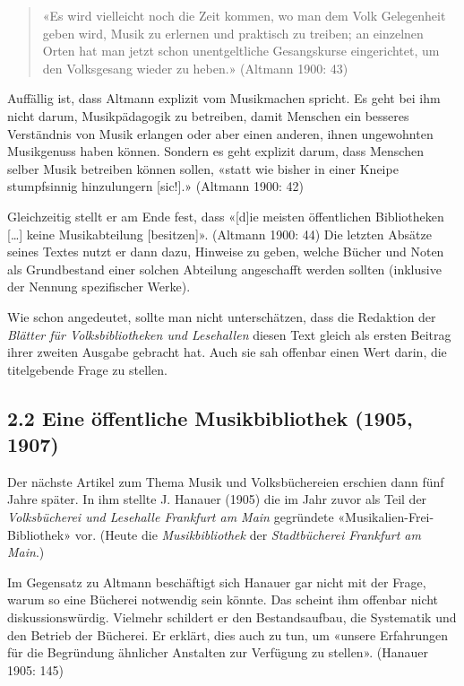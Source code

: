 \documentclass[a4paper,
fontsize=11pt,
oneside,
numbers=noperiodatend,
parskip=half-,
bibliography=totoc,
final
]{scrartcl}
\begin{document}
\begin{quote}
«Es wird vielleicht noch die Zeit kommen, wo man dem Volk Gelegenheit
geben wird, Musik zu erlernen und praktisch zu treiben; an einzelnen
Orten hat man jetzt schon unentgeltliche Gesangskurse eingerichtet, um
den Volksgesang wieder zu heben.» (Altmann 1900: 43)
\end{quote}

Auffällig ist, dass Altmann explizit vom Musikmachen spricht. Es geht
bei ihm nicht darum, Musikpädagogik zu betreiben, damit Menschen ein
besseres Verständnis von Musik erlangen oder aber einen anderen, ihnen
ungewohnten Musikgenuss haben können. Sondern es geht explizit darum,
dass Menschen selber Musik betreiben können sollen, «statt wie bisher in
einer Kneipe stumpfsinnig hinzulungern {[}sic!{]}.» (Altmann 1900: 42)

Gleichzeitig stellt er am Ende fest, dass «{[}d{]}ie meisten
öffentlichen Bibliotheken {[}\ldots{]} keine Musikabteilung
{[}besitzen{]}». (Altmann 1900: 44) Die letzten Absätze seines Textes
nutzt er dann dazu, Hinweise zu geben, welche Bücher und Noten als
Grundbestand einer solchen Abteilung angeschafft werden sollten
(inklusive der Nennung spezifischer Werke).

Wie schon angedeutet, sollte man nicht unterschätzen, dass die Redaktion
der \emph{Blätter für Volksbibliotheken und Lesehallen} diesen Text
gleich als ersten Beitrag ihrer zweiten Ausgabe gebracht hat. Auch sie
sah offenbar einen Wert darin, die titelgebende Frage zu stellen.

\hypertarget{eine-uxf6ffentliche-musikbibliothek-1905-1907}{%
\subsection{2.2 Eine öffentliche Musikbibliothek (1905,
1907)}\label{eine-uxf6ffentliche-musikbibliothek-1905-1907}}

Der nächste Artikel zum Thema Musik und Volksbüchereien erschien dann
fünf Jahre später. In ihm stellte J. Hanauer (1905) die im Jahr zuvor
als Teil der \emph{Volksbücherei und Lesehalle Frankfurt am Main}
gegründete «Musikalien-Frei-Bibliothek» vor. (Heute die
\emph{Musikbibliothek} der \emph{Stadtbücherei Frankfurt am Main}.)

Im Gegensatz zu Altmann beschäftigt sich Hanauer gar nicht mit der
Frage, warum so eine Bücherei notwendig sein könnte. Das scheint ihm
offenbar nicht diskussionswürdig. Vielmehr schildert er den
Bestandsaufbau, die Systematik und den Betrieb der Bücherei. Er erklärt,
dies auch zu tun, um «unsere Erfahrungen für die Begründung ähnlicher
Anstalten zur Verfügung zu stellen». (Hanauer 1905: 145)
\end{document}
